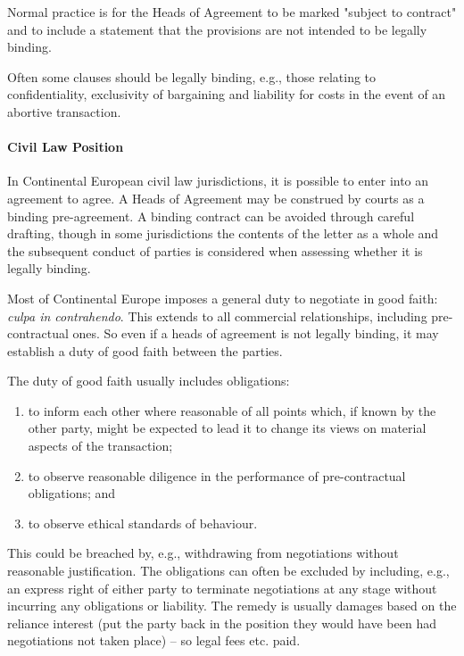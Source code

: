\documentclass[
]{article}
\providecommand{\tightlist}{%
  \setlength{\itemsep}{0pt}\setlength{\parskip}{0pt}}
\begin{document}
Normal practice is for the Heads of Agreement to be marked "subject to
contract" and to include a statement that the provisions are not
intended to be legally binding.

Often some clauses should be legally binding, e.g., those relating to
confidentiality, exclusivity of bargaining and liability for costs in
the event of an abortive transaction.

\hypertarget{civil-law-position}{%
\paragraph{Civil Law Position}\label{civil-law-position}}

In Continental European civil law jurisdictions, it is possible to enter
into an agreement to agree. A Heads of Agreement may be construed by
courts as a binding pre-agreement. A binding contract can be avoided
through careful drafting, though in some jurisdictions the contents of
the letter as a whole and the subsequent conduct of parties is
considered when assessing whether it is legally binding.

Most of Continental Europe imposes a general duty to negotiate in good
faith: \emph{culpa in contrahendo}. This extends to all commercial
relationships, including pre-contractual ones. So even if a heads of
agreement is not legally binding, it may establish a duty of good faith
between the parties.

The duty of good faith usually includes obligations:

\begin{enumerate}
\tightlist
\item
  to inform each other where reasonable of all points which, if known by
  the other party, might be expected to lead it to change its views on
  material aspects of the transaction;
\item
  to observe reasonable diligence in the performance of pre-contractual
  obligations; and
\item
  to observe ethical standards of behaviour.
\end{enumerate}

This could be breached by, e.g., withdrawing from negotiations without
reasonable justification. The obligations can often be excluded by
including, e.g., an express right of either party to terminate
negotiations at any stage without incurring any obligations or
liability. The remedy is usually damages based on the reliance interest
(put the party back in the position they would have been had
negotiations not taken place) -- so legal fees etc. paid.
\end{document}
